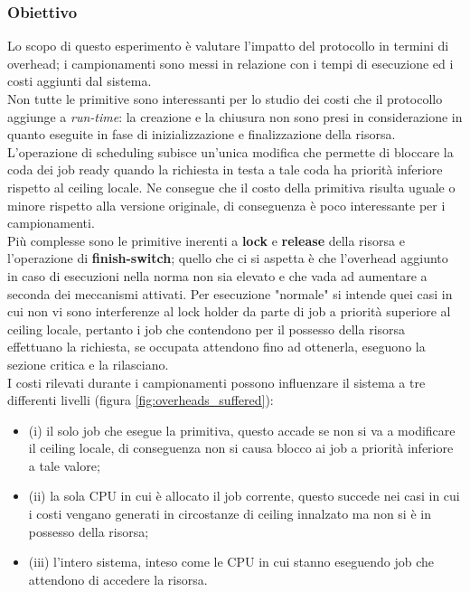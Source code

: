 \subsubsection{Obiettivo}
\label{sec:overhead_ob}

\noindent Lo scopo di questo esperimento è valutare l'impatto del protocollo in termini di overhead; i campionamenti sono messi in relazione con i tempi di esecuzione ed i costi aggiunti dal sistema.\\

\noindent Non tutte le primitive sono interessanti per lo studio dei costi che il protocollo aggiunge a \textit{run-time}: la creazione e la chiusura non sono presi in considerazione in quanto eseguite in fase di inizializzazione e finalizzazione della risorsa.\\

\noindent L'operazione di scheduling subisce un'unica modifica che permette di bloccare la coda dei job ready quando la richiesta in testa a tale coda ha priorità inferiore rispetto al ceiling locale. Ne consegue che il costo della primitiva risulta uguale o minore rispetto alla versione originale, di conseguenza è poco interessante per i campionamenti.\\

\noindent Più complesse sono le primitive inerenti a \textbf{lock} e \textbf{release} della risorsa e l'operazione di \textbf{finish-switch}; quello che ci si aspetta è che l'overhead aggiunto in caso di esecuzioni nella norma non sia elevato e che vada ad aumentare a seconda dei meccanismi attivati. Per esecuzione "normale" si intende quei casi in cui non vi sono interferenze al lock holder da parte di job a priorità superiore al ceiling locale, pertanto i job che contendono per il possesso della risorsa effettuano la richiesta, se occupata attendono fino ad ottenerla, eseguono la sezione critica e la rilasciano.\\

\noindent I costi rilevati durante i campionamenti possono influenzare il sistema a tre differenti livelli (figura \ref{fig:overheads_suffered}):\\

\begin{itemize}
	\item {\color{red} (i)} il solo job che esegue la primitiva, questo accade se non si va a modificare il ceiling locale, di conseguenza non si causa blocco ai job a priorità inferiore a tale valore;
	\item {\color{red} (ii)} la sola CPU in cui è allocato il job corrente, questo succede nei casi in cui i costi vengano generati in circostanze di ceiling innalzato ma non si è in possesso della risorsa;
	\item {\color{red} (iii)} l'intero sistema, inteso come le CPU in cui stanno eseguendo job che attendono di accedere la risorsa.
\end{itemize}

